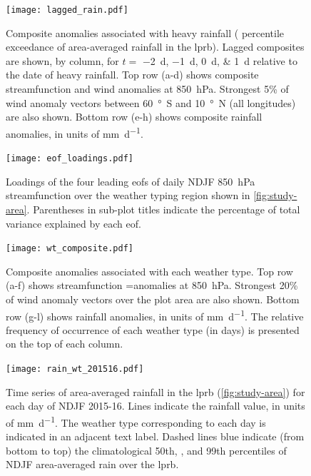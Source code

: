 \documentclass[twocol]{ametsoc}
\begin{document}
\begin{figure}	\noindent\texttt{[image: lagged\_rain.pdf]}
	\caption{
		Composite anomalies associated with heavy rainfall ( percentile exceedance of area-averaged rainfall in the \acrlong{lprb}).
		Lagged composites are shown, by column, for $t = $ \SIlist{-2;-1;0;1}{\day} relative to the date of heavy rainfall.
		Top row (a-d) shows composite streamfunction and wind anomalies at \SIlist{850}{\hecto\pascal}.
		Strongest 5\% of wind anomaly vectors between \SI{60}{\degree S} and \SI{10}{\degree N} (all longitudes) are also shown.
		Bottom row (e-h) shows composite rainfall anomalies, in units of \si{\milli\meter\per\day}.
	}\label{fig:lagged-rain}
\end{figure}

\begin{figure}
	\noindent\texttt{[image: eof\_loadings.pdf]}
	\caption{
		Loadings of the four leading \glspl{eof} of daily NDJF \SI{850}{\hecto\pascal} streamfunction over the weather typing region shown in \cref{fig:study-area}.
		Parentheses in sub-plot titles indicate the percentage of total variance explained by each \gls{eof}.
	}\label{fig:eof-loading}
\end{figure}

\begin{figure}
	\noindent\texttt{[image: wt\_composite.pdf]}
	\caption{
		Composite anomalies associated with each weather type.
		Top row (a-f) shows streamfunction =anomalies at \SIlist{850}{\hecto\pascal}.
		Strongest 20\% of wind anomaly vectors over the plot area are also shown.
		Bottom row (g-l) shows rainfall anomalies, in units of \si{\milli\meter\per\day}. 
		The relative frequency of occurrence of each weather type (in days) is presented on the top of each column.
	}
	\label{fig:wt-composite}
\end{figure}

\begin{figure}
	\noindent\texttt{[image: rain\_wt\_201516.pdf]}
	\caption{
		Time series of area-averaged rainfall in the \acrlong{lprb} (\cref{fig:study-area}) for each day of NDJF  2015-16.
		Lines indicate the rainfall value, in units of \si{\milli\meter\per\day}.
        The weather type corresponding to each day is indicated in an adjacent text label.
		Dashed lines blue indicate (from bottom to top) the climatological 50th, , and 99th percentiles of NDJF area-averaged rain over the \acrlong{lprb}.
	}\label{fig:rain-wt}
\end{figure}
\end{document}
